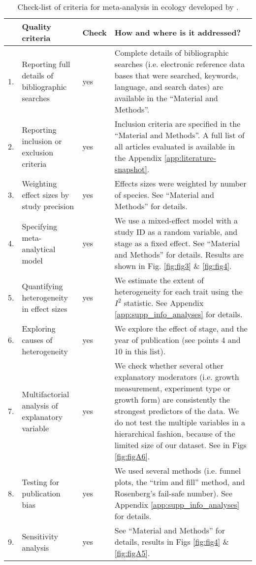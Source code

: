 \documentclass[a4paper,11pt]{article}
\begin{document}
\clearpage
\begin{table}[h!]
\centering
\caption{Check-list of criteria for meta-analysis in ecology developed by \citet{Koricheva:2014ku}.}
{\footnotesize
\vspace{0.5cm}
\begin{tabular}{p{0.2cm}p{4cm}p{0.8cm}p{7cm}}
  \hline
  & Quality criteria & Check & How and where is it addressed?\\
  \hline
  1.& Reporting full details of bibliographic searches & yes	& Complete details of bibliographic searches (i.e. electronic reference data bases that were searched, keywords, language, and search dates) are available in the ``Material and Methods''.\\
  2.& Reporting inclusion or exclusion criteria & yes & Inclusion criteria are specified in the ``Material and Methods''. A full list of all articles evaluated is available in the Appendix \ref{app:literature-snapshot}.\\
  3.& Weighting effect sizes by study precision & yes & Effects sizes were weighted by number of species. See	``Material and Methods'' for details.\\
 4.& Specifying meta-analytical model &	yes	& We use a mixed-effect model with a study ID as a random variable, and stage as a fixed effect. See ``Material and Methods'' for details. Results are shown in Fig. \ref{fig:fig3} \& \ref{fig:fig4}.\\
 5.& Quantifying heterogeneity in effect sizes &	yes &	We estimate the extent of heterogeneity for each trait using the $I^{2}$ statistic. See Appendix \ref{app:supp_info_analyses} for details.\\
 6.& Exploring causes of heterogeneity & yes &	We explore the effect of stage, and the year of publication (see points 4 and 10 in this list).\\
 7.& Multifactorial analysis of explanatory variable	& yes & We check whether several other explanatory moderators (i.e. growth measurement, experiment type or growth form) are consistently the strongest predictors of the data. We do not test the multiple variables in a hierarchical fashion, because of the limited size of our dataset. See in Figs \ref{fig:figA6}.\\
  8.& Testing for publication bias &	yes	& We used several methods (i.e. funnel plots, the ``trim and fill'' method, and Rosenberg's fail-safe number). See Appendix \ref{app:supp_info_analyses} for details.\\
  9.& Sensitivity analysis &	yes &See ``Material and Methods'' for details, results in Figs \ref{fig:fig4} \& \ref{fig:figA5}.\\

\end{tabular}}
\end{table}
\end{document}
